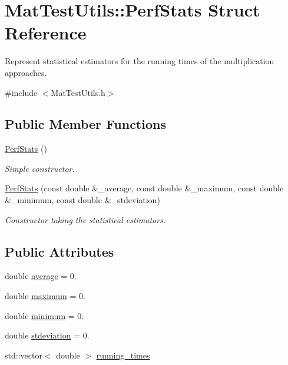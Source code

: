 \hypertarget{structMatTestUtils_1_1PerfStats}{}\section{Mat\+Test\+Utils\+:\+:Perf\+Stats Struct Reference}
\label{structMatTestUtils_1_1PerfStats}


Represent statistical estimators for the running times of the multiplication approaches.  




{\ttfamily \#include $<$Mat\+Test\+Utils.\+h$>$}

\subsection*{Public Member Functions}
\begin{DoxyCompactItemize}
\item 
\mbox{\label{structMatTestUtils_1_1PerfStats_a263c5df4f6f542fb2f4e30d14eed2710}} 
\mbox{\hyperlink{structMatTestUtils_1_1PerfStats_a263c5df4f6f542fb2f4e30d14eed2710}{Perf\+Stats}} ()
\begin{DoxyCompactList}\small\item\em Simple constructor. \end{DoxyCompactList}\item 
\mbox{\hyperlink{structMatTestUtils_1_1PerfStats_a3f58c1e90e5b3c9266b25ba162d34a14}{Perf\+Stats}} (const double \&\+\_\+average, const double \&\+\_\+maximum, const double \&\+\_\+minimum, const double \&\+\_\+stdeviation)
\begin{DoxyCompactList}\small\item\em Constructor taking the statistical estimators. \end{DoxyCompactList}\end{DoxyCompactItemize}
\subsection*{Public Attributes}
\begin{DoxyCompactItemize}
\item 
double \mbox{\hyperlink{structMatTestUtils_1_1PerfStats_a6b3cbd6a44fb070074555ab46918310d}{average}} = 0.
\item 
double \mbox{\hyperlink{structMatTestUtils_1_1PerfStats_a584afc89a2781a9c6264bc7480439e21}{maximum}} = 0.
\item 
double \mbox{\hyperlink{structMatTestUtils_1_1PerfStats_a032e057a96d030ef36355b5aac4fe596}{minimum}} = 0.
\item 
double \mbox{\hyperlink{structMatTestUtils_1_1PerfStats_a103f9bae3107f94f33ff758551a1e434}{stdeviation}} = 0.
\item 
std\+::vector$<$ double $>$ \mbox{\hyperlink{structMatTestUtils_1_1PerfStats_afb16d607f11552c526b636154d907a53}{running\+\_\+times}}
\end{DoxyCompactItemize}



